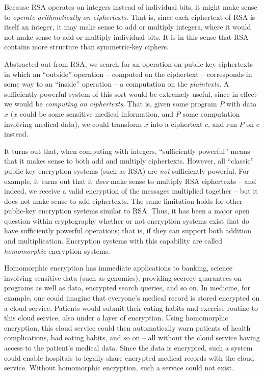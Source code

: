 Because RSA operates on integers instead of individual bits, it might make sense to \emph{operate arithmetically on ciphertexts}. That is, since each ciphertext of RSA is itself an integer, it may make sense to add or multiply integers, where it would not make sense to add or multiply individual bits. It is in this sense that RSA contains more structure than symmetric-key ciphers.

Abstracted out from RSA, we search for an operation on public-key ciphertexts in which an ``outside'' operation -- computed on the ciphertext -- corresponds in some way to an ``inside'' operation -- a computation on the \emph{plaintexts}. A sufficiently powerful system of this sort would be extremely useful, since in effect we would be \emph{computing on ciphertexts}. That is, given some program $P$ with data $x$ ($x$ could be some sensitive medical information, and $P$ some computation involving medical data), we could transform $x$ into a ciphertext $c$, and run $P$ on $c$ instead.

It turns out that, when computing with integers, ``sufficiently powerful'' means that it makes sense to both add and multiply ciphertexts. However, all ``classic'' public key encryption systems (such as RSA) are \emph{not} sufficiently powerful. For example, it turns out that it \emph{does} make sense to multiply RSA ciphertexts -- and indeed, we receive a valid encryption of the messages multiplied together -- but it does not make sense to add ciphertexts. The same limitation holds for other public-key encryption systems similar to RSA. Thus, it has been a major open question within cryptography whether or not encryption systems exist that do have sufficiently powerful operations; that is, if they can support both addition and multiplication. Encryption systems with this capability are called \emph{homomorphic} encryption systems.

Homomorphic encryption has immediate applications to banking, science involving sensitive data (such as genomics), providing secrecy guarantees on programs as well as data, encrypted search queries, and so on. In medicine, for example, one could imagine that everyone's medical record is stored encrypted on a cloud service. Patients would submit their eating habits and exercise routine to this cloud service, also under a layer of encryption. Using homomorphic encryption, this cloud service could then automatically warn patients of health complications, bad eating habits, and so on -- all without the cloud service having access to the patient's medical data. Since the data is encrypted, such a system could enable hospitals to legally share encrypted medical records with the cloud service. Without homomorphic encryption, such a service could not exist.

